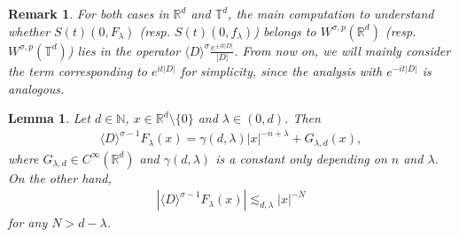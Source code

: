 \documentclass[a4paper, reqno, 11pt]{amsart}
\newtheorem{lemma}[theorem]{Lemma}
\newtheorem{remark}[theorem]{Remark}
\theoremstyle{definition}
\begin{document}
\begin{remark}
For both cases in $\mathbb{R}^d$ and $\mathbb{T}^d$, the main computation to understand whether $S(t)(0,F_{\lambda})$ (resp. $S(t)(0,f_{\lambda})$) belongs to $W^{\sigma,p}(\mathbb{R}^d)$ (resp. $W^{\sigma,p}(\mathbb{T}^d)$) lies in the operator $\langle D \rangle^{\sigma} \frac{e^{\pm it|D|}}{|D|}$. From now on, we will mainly consider the term corresponding to $e^{it|D|}$ for simplicity, since the analysis with $e^{-it|D|}$ is analogous.
\end{remark}


\begin{lemma}\label{lemma:Flambda}
Let $d \in \mathbb{N}$, $x \in \mathbb{R}^d \setminus \{0\}$ and $\lambda \in (0,d)$. Then
\begin{align*}
\langle D \rangle^{\sigma-1} F_{\lambda}(x) = \gamma(d,\lambda) |x|^{-n+\lambda} + G_{\lambda,d}(x),
\end{align*}
where $G_{\lambda,d} \in C^{\infty}(\mathbb{R}^d)$ and $\gamma(d,\lambda)$ is a constant only depending on $n$ and $\lambda$. On the other hand,
\begin{align*}
|\langle D \rangle^{\sigma-1} F_{\lambda}(x)| \lesssim_{d,\lambda} |x|^{-N}
\end{align*} 
for any $N > d - \lambda$.
\end{lemma}
\end{document}
